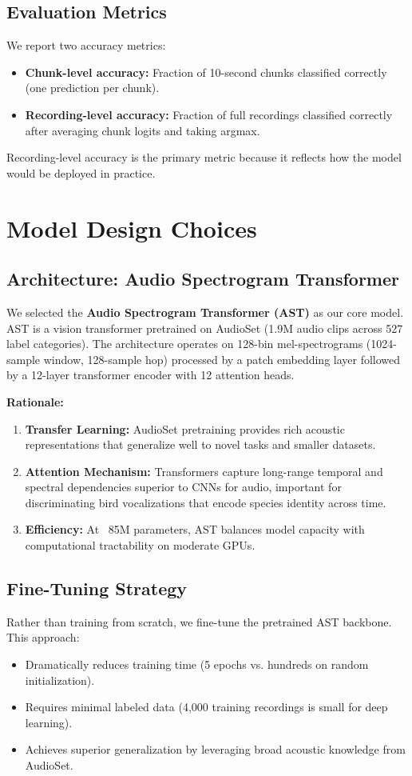 \documentclass[11pt, a4paper]{article}
\begin{document}
\subsection{Evaluation Metrics}
We report two accuracy metrics:
\begin{itemize}
  \item \textbf{Chunk-level accuracy:} Fraction of 10-second chunks classified correctly (one prediction per chunk).
  \item \textbf{Recording-level accuracy:} Fraction of full recordings classified correctly after averaging chunk logits and taking argmax.
\end{itemize}
Recording-level accuracy is the primary metric because it reflects how the model would be deployed in practice.

\section{Model Design Choices}

\subsection{Architecture: Audio Spectrogram Transformer}
We selected the \textbf{Audio Spectrogram Transformer (AST)} as our core model. AST is a vision transformer pretrained on AudioSet (1.9M audio clips across 527 label categories). The architecture operates on 128-bin mel-spectrograms (1024-sample window, 128-sample hop) processed by a patch embedding layer followed by a 12-layer transformer encoder with 12 attention heads.

\textbf{Rationale:}
\begin{enumerate}
  \item \textbf{Transfer Learning:} AudioSet pretraining provides rich acoustic representations that generalize well to novel tasks and smaller datasets.
  \item \textbf{Attention Mechanism:} Transformers capture long-range temporal and spectral dependencies superior to CNNs for audio, important for discriminating bird vocalizations that encode species identity across time.
  \item \textbf{Efficiency:} At ~85M parameters, AST balances model capacity with computational tractability on moderate GPUs.
\end{enumerate}

\subsection{Fine-Tuning Strategy}
Rather than training from scratch, we fine-tune the pretrained AST backbone. This approach:
\begin{itemize}
  \item Dramatically reduces training time (5 epochs vs. hundreds on random initialization).
  \item Requires minimal labeled data (4,000 training recordings is small for deep learning).
  \item Achieves superior generalization by leveraging broad acoustic knowledge from AudioSet.
\end{itemize}
\end{document}
